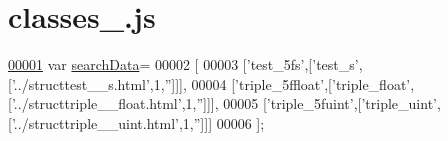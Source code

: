 \hypertarget{classes__7_8js_source}{}\section{classes\+\_.\+js}
\label{classes__7_8js_source}

\begin{DoxyCode}
\hypertarget{classes__7_8js_source.tex_l00001}{}\hyperlink{classes__7_8js_ad01a7523f103d6242ef9b0451861231e}{00001} var \hyperlink{classes__7_8js_ad01a7523f103d6242ef9b0451861231e}{searchData}=
00002 [
00003   [\textcolor{stringliteral}{'test\_5fs'},[\textcolor{stringliteral}{'test\_s'},[\textcolor{stringliteral}{'../structtest\_\_s.html'},1,\textcolor{stringliteral}{''}]]],
00004   [\textcolor{stringliteral}{'triple\_5ffloat'},[\textcolor{stringliteral}{'triple\_float'},[\textcolor{stringliteral}{'../structtriple\_\_float.html'},1,\textcolor{stringliteral}{''}]]],
00005   [\textcolor{stringliteral}{'triple\_5fuint'},[\textcolor{stringliteral}{'triple\_uint'},[\textcolor{stringliteral}{'../structtriple\_\_uint.html'},1,\textcolor{stringliteral}{''}]]]
00006 ];
\end{DoxyCode}
